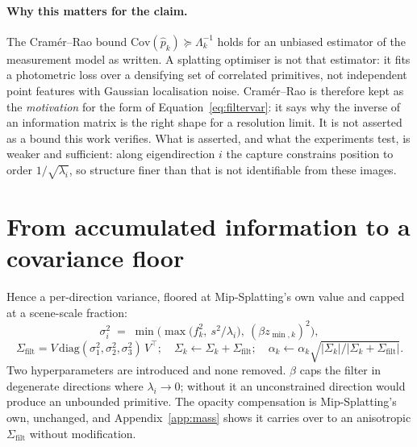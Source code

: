 \paragraph{Why this matters for the claim.} The Cram\'er--Rao bound
$\mathrm{Cov}(\hat p_k) \succeq \Lambda_k^{-1}$ holds for an unbiased estimator
of the measurement model as written. A splatting optimiser is not that estimator:
it fits a photometric loss over a densifying set of correlated primitives, not
independent point features with Gaussian localisation noise. Cram\'er--Rao is
therefore kept as the \emph{motivation} for the form of Equation~\eqref{eq:filtervar}: it says why
the inverse of an information matrix is the right shape for a resolution limit.
It is not asserted as a bound this work verifies. What is asserted, and what the experiments test, is
weaker and sufficient: along eigendirection $i$ the capture constrains position
to order $1/\sqrt{\lambda_i}$, so structure finer than that is not identifiable
from these images.


\section{From accumulated information to a covariance floor}
Hence a per-direction variance, floored at Mip-Splatting's own value and capped
at a scene-scale fraction:
\begin{equation}
  \sigma_i^2 \;=\; \min\!\Big(\max\big(f_k^2,\ s^2/\lambda_i\big),\ (\beta z_{\min,k})^2\Big),
  \label{eq:filtervar}
\end{equation}
\begin{equation}
  \Sigma_{\mathrm{filt}} = V\,\mathrm{diag}(\sigma_1^2,\sigma_2^2,\sigma_3^2)\,V^{\!\top};
  \quad \Sigma_k \leftarrow \Sigma_k + \Sigma_{\mathrm{filt}};
  \quad \alpha_k \leftarrow \alpha_k\sqrt{|\Sigma_k|/|\Sigma_k+\Sigma_{\mathrm{filt}}|}.
  \label{eq:filter}
\end{equation}
Two hyperparameters are introduced and none removed. $\beta$ caps the filter in
degenerate directions where $\lambda_i \to 0$; without it an unconstrained
direction would produce an unbounded primitive. The opacity compensation is
Mip-Splatting's own, unchanged, and Appendix~\ref{app:mass} shows it carries over
to an anisotropic $\Sigma_{\mathrm{filt}}$ without modification.

